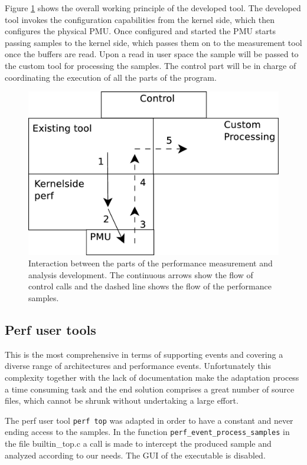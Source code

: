 Figure \ref{fig:dstrategy} shows the overall working principle of the developed tool. The developed tool invokes the configuration capabilities from the kernel side, which then configures the physical PMU. Once configured and started the PMU starts passing samples to the kernel side, which passes them on to the measurement tool once the buffers are read. Upon a read in user space the sample will be passed to the custom tool for processing the samples. The control part will be in charge of coordinating the execution of all the parts of the program.

\begin{figure}
	\centering
		\includegraphics[width=.8\textwidth]{figures/dev-strategy.eps}
		\caption[Flow of information in the development]{Interaction between the parts of the performance measurement and analysis development. The continuous arrows show the flow of control calls and the dashed line shows the flow of the performance samples.}
		\label{fig:dstrategy}
\end{figure}
\subsection{Perf user tools}\label{section:perf-ut}

This is the most comprehensive in terms of supporting events and covering a diverse range of architectures and performance events. Unfortunately this complexity together with the lack of documentation make the adaptation process a time consuming task and the end solution comprises a great number of source files, which cannot be shrunk without undertaking a large effort. 

The perf user tool \texttt{perf top} was adapted in order to have a constant and never ending access to the samples. In the function \texttt{perf\_event\_process\_samples} in the file builtin\_top.c a call is made to intercept the produced sample and analyzed according to our needs. The GUI of the executable is disabled.

